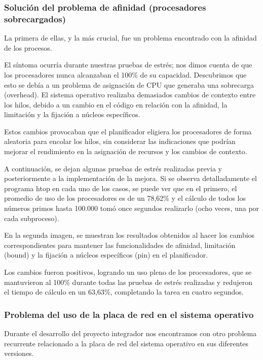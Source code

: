 \subsubsection{Solución del problema de afinidad (procesadores sobrecargados)}

La primera de ellas, y la más crucial, fue un problema encontrado con la afinidad de los procesos.

El síntoma ocurría durante nuestras pruebas de estrés; nos dimos cuenta de que los procesadores nunca alcanzaban el 100\% de su capacidad. Descubrimos que esto se debía a un problema de asignación de CPU que generaba una sobrecarga (overhead). El sistema operativo realizaba demasiados cambios de contexto entre los hilos, debido a un cambio en el código en relación con la afinidad, la limitación y la fijación a núcleos específicos.

Estos cambios provocaban que el planificador eligiera los procesadores de forma aleatoria para encolar los hilos, sin considerar las indicaciones que podrían mejorar el rendimiento en la asignación de recursos y los cambios de contexto.


A continuación, se dejan algunas pruebas de estrés realizadas previa y posteriormente a la implementación de la mejora. Si se observa detalladamente el programa htop en cada uno de los casos, se puede ver que en el primero, el promedio de uso de los procesadores es de un 78,62\% y el cálculo de todos los números primos hasta 100.000 tomó once segundos realizarlo (ocho veces, una por cada subproceso).

En la segunda imagen, se muestran los resultados obtenidos al hacer los cambios correspondientes para mantener las funcionalidades de afinidad, limitación (bound) y la fijación a núcleos específicos (pin) en el planificador.

Los cambios fueron positivos, logrando un uso pleno de los procesadores, que se mantuvieron al 100\% durante todas las pruebas de estrés realizadas y redujeron el tiempo de cálculo en un 63,63\%, completando la tarea en cuatro segundos.



\subsubsection{Problema del uso de la placa de red en el sistema operativo}

Durante el desarrollo del proyecto integrador nos encontramos con otro problema recurrente relacionado a la placa de red del sistema operativo en sus diferentes versiones.

